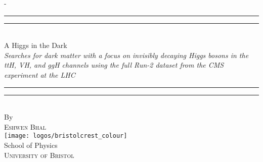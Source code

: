 %
%
% 
%
%
\begin{titlingpage}
\begin{SingleSpace}
\calccentering{\unitlength} 
\begin{adjustwidth*}{\unitlength}{-\unitlength}
\vspace*{13mm}
\begin{center}
\rule[0.5ex]{\linewidth}{2pt}\vspace*{-\baselineskip}\vspace*{3.2pt}
\rule[0.5ex]{\linewidth}{1pt}\\[\baselineskip]
{\HUGE A Higgs in the Dark}\\[4mm] %
{\Large \textit{Searches for dark matter with a focus on invisibly decaying Higgs bosons in the ttH, VH, and ggH channels using the full Run-2 dataset from the CMS experiment at the LHC}}\\ %
\rule[0.5ex]{\linewidth}{1pt}\vspace*{-\baselineskip}\vspace{3.2pt}
\rule[0.5ex]{\linewidth}{2pt}\\
\vspace{6.5mm}
{\large By}\\
\vspace{6.5mm}
{\large\textsc{Eshwen Bhal}}\\  %
\vspace{11mm}
\texttt{[image: logos/bristolcrest\_colour]}\\  %
\vspace{6mm}
{\large School of Physics\\  %
\textsc{University of Bristol}}\\  %
\vspace{11mm}

\end{center}
\end{adjustwidth*}
\end{SingleSpace}
\end{titlingpage}
